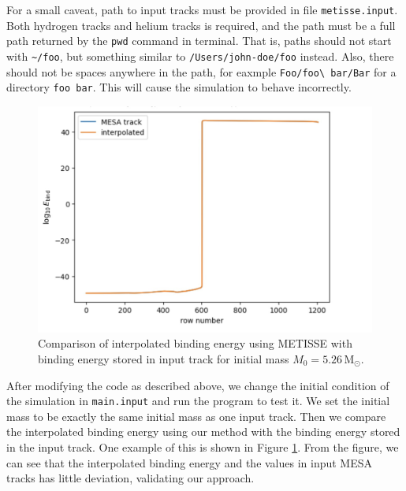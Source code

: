 \documentclass[12pt]{article}
\newcommand{\Msun}{\,\mathrm{M_{\odot}}}
\begin{document}
For a small caveat, path to input tracks must be provided in file \verb|metisse.input|. Both hydrogen tracks and helium tracks is required, and the path must be a full path returned by the \verb|pwd| command in terminal. That is, paths should not start with \verb|~/foo|, but something similar to \verb|/Users/john-doe/foo| instead. Also, there should not be spaces anywhere in the path, for eaxmple \verb*|Foo/foo\ bar/Bar| for a directory \verb*|foo bar|. This will cause the simulation to behave incorrectly. 

\begin{figure}
  \centering
  \includegraphics[width = 0.6\linewidth]{fig/be-comparison.png}
  \caption{Comparison of interpolated binding energy using METISSE with binding energy stored in input track for initial mass $M_0 = 5.26 \Msun$.}
  \label{be-comparison}
\end{figure}

After modifying the code as described above, we change the initial condition of the simulation in \verb|main.input| and run the program to test it. We set the initial mass to be exactly the same initial mass as one input track. Then we compare the interpolated binding energy using our method with the binding energy stored in the input track. One example of this is shown in Figure \ref{be-comparison}. From the figure, we can see that the interpolated binding energy and the values in input MESA tracks has little deviation, validating our approach.

\newpage


\end{document}
